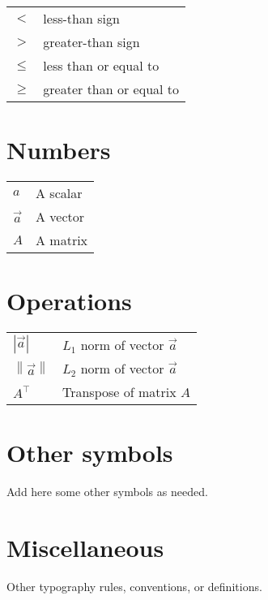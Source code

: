 \begin{longtable}{ll}
$<$    & less-than sign\\
$>$    & greater-than sign\\
$\leq$ & less than or equal to\\
$\geq$ & greater than or equal to\\
\end{longtable}


\section{Numbers}
\label{notation:s:numbers}

\begin{longtable}{ll}
$a$         & A scalar\\
$\vec{a}$   & A vector\\
$A$         & A matrix\\
\end{longtable}


\section{Operations}
\label{notation:s:operations}

\begin{longtable}{ll}
$|\vec{a}|$                      & $L_1$ norm of vector $\vec{a}$\\
$\left\lVert\vec{a}\right\rVert$ & $L_2$ norm of vector $\vec{a}$\\
$A^\top$                         & Transpose of matrix $A$\\
\end{longtable}


\section{Other symbols}
\label{notation:s:other-symbols}

Add here some other symbols as needed.


\section{Miscellaneous}
\label{notation:s:miscellaneous}

Other typography rules, conventions, or definitions.


\cleardoublepage
\setcounter{secnumdepth}{\mysecnumdepth}

\endgroup
